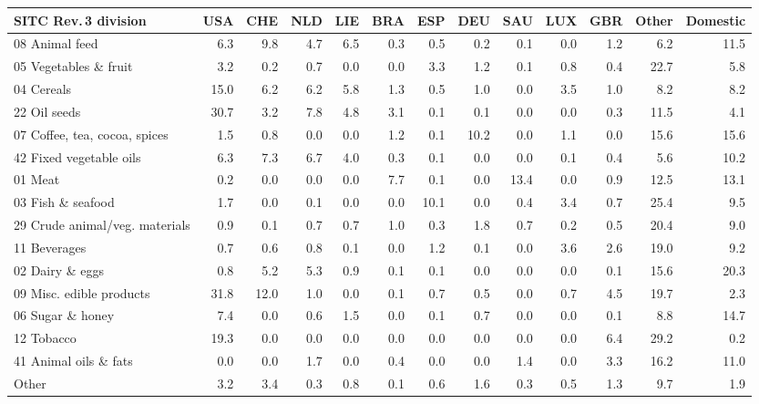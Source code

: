 \begin{tabular}{lrrrrrrrrrrrr}
\toprule
SITC Rev.\,3 division & USA & CHE & NLD & LIE & BRA & ESP & DEU & SAU & LUX & GBR & Other & Domestic \\
\midrule
08 Animal feed & 6.3 & 9.8 & 4.7 & 6.5 & 0.3 & 0.5 & 0.2 & 0.1 & 0.0 & 1.2 & 6.2 & 11.5 \\
05 Vegetables \& fruit & 3.2 & 0.2 & 0.7 & 0.0 & 0.0 & 3.3 & 1.2 & 0.1 & 0.8 & 0.4 & 22.7 & 5.8 \\
04 Cereals & 15.0 & 6.2 & 6.2 & 5.8 & 1.3 & 0.5 & 1.0 & 0.0 & 3.5 & 1.0 & 8.2 & 8.2 \\
22 Oil seeds & 30.7 & 3.2 & 7.8 & 4.8 & 3.1 & 0.1 & 0.1 & 0.0 & 0.0 & 0.3 & 11.5 & 4.1 \\
07 Coffee, tea, cocoa, spices & 1.5 & 0.8 & 0.0 & 0.0 & 1.2 & 0.1 & 10.2 & 0.0 & 1.1 & 0.0 & 15.6 & 15.6 \\
42 Fixed vegetable oils & 6.3 & 7.3 & 6.7 & 4.0 & 0.3 & 0.1 & 0.0 & 0.0 & 0.1 & 0.4 & 5.6 & 10.2 \\
01 Meat & 0.2 & 0.0 & 0.0 & 0.0 & 7.7 & 0.1 & 0.0 & 13.4 & 0.0 & 0.9 & 12.5 & 13.1 \\
03 Fish \& seafood & 1.7 & 0.0 & 0.1 & 0.0 & 0.0 & 10.1 & 0.0 & 0.4 & 3.4 & 0.7 & 25.4 & 9.5 \\
29 Crude animal/veg. materials & 0.9 & 0.1 & 0.7 & 0.7 & 1.0 & 0.3 & 1.8 & 0.7 & 0.2 & 0.5 & 20.4 & 9.0 \\
11 Beverages & 0.7 & 0.6 & 0.8 & 0.1 & 0.0 & 1.2 & 0.1 & 0.0 & 3.6 & 2.6 & 19.0 & 9.2 \\
02 Dairy \& eggs & 0.8 & 5.2 & 5.3 & 0.9 & 0.1 & 0.1 & 0.0 & 0.0 & 0.0 & 0.1 & 15.6 & 20.3 \\
09 Misc. edible products & 31.8 & 12.0 & 1.0 & 0.0 & 0.1 & 0.7 & 0.5 & 0.0 & 0.7 & 4.5 & 19.7 & 2.3 \\
06 Sugar \& honey & 7.4 & 0.0 & 0.6 & 1.5 & 0.0 & 0.1 & 0.7 & 0.0 & 0.0 & 0.1 & 8.8 & 14.7 \\
12 Tobacco & 19.3 & 0.0 & 0.0 & 0.0 & 0.0 & 0.0 & 0.0 & 0.0 & 0.0 & 6.4 & 29.2 & 0.2 \\
41 Animal oils \& fats & 0.0 & 0.0 & 1.7 & 0.0 & 0.4 & 0.0 & 0.0 & 1.4 & 0.0 & 3.3 & 16.2 & 11.0 \\
Other & 3.2 & 3.4 & 0.3 & 0.8 & 0.1 & 0.6 & 1.6 & 0.3 & 0.5 & 1.3 & 9.7 & 1.9 \\
\bottomrule
\end{tabular}
